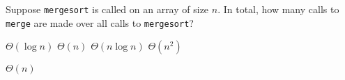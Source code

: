 \begin{prob}

    Suppose \texttt{mergesort} is called on an array of size $n$. In total, how
    many calls to \texttt{merge} are made over all calls to \texttt{mergesort}?

    \begin{choices}
        \choice $\Theta(\log n)$
        \choice $\Theta(n)$
        \choice $\Theta(n \log n)$
        \choice $\Theta(n^2)$
    \end{choices}

    \begin{soln}
        $\Theta(n)$
    \end{soln}

\end{prob}
